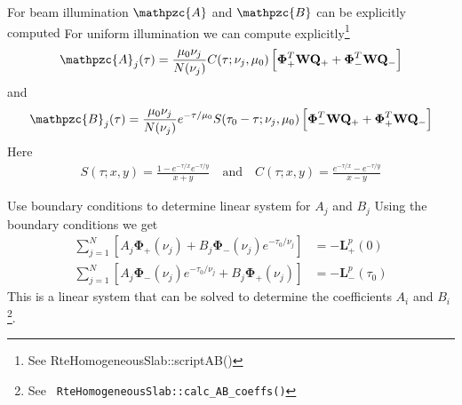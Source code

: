 \documentclass[14]{beamer}
\newcommand{\mvec}[1]{\mathbf{#1}}
\newcommand{\gvec}[1]{\boldsymbol{#1}}
\newcommand{\script}[1]{\mathpzc{#1}}
\begin{document}
\begin{frame}{For beam illumination $\script{A}$ and $\script{B}$ can
    be explicitly computed}
  For uniform illumination we can compute explicitly\footnote{See
    RteHomogeneousSlab::scriptAB()}
  \begin{align}
    \script{A}_j(\tau) = \frac{\mu_0 \nu_j}{N(\nu_j)}
    C(\tau ; \nu_j, \mu_0)
    \left[
      \gvec{\Phi}_+^T \mvec{W} \mvec{Q}_+ +
      \gvec{\Phi}_-^T \mvec{W} \mvec{Q}_-
    \right]
  \end{align}
  and
  \begin{align}
    \script{B}_j(\tau) = \frac{\mu_0 \nu_j}{N(\nu_j)}
    e^{-\tau/\mu_0}S(\tau_0-\tau ; \nu_j, \mu_0)
    \left[
      \gvec{\Phi}_-^T \mvec{W} \mvec{Q}_+ +
      \gvec{\Phi}_+^T \mvec{W} \mvec{Q}_-
    \right]
  \end{align}
  Here
  \begin{align}
    S(\tau;x,y) = \frac{1-e^{-\tau/x}e^{-\tau/y}}{x+y} \quad\textrm{and}\quad
    C(\tau;x,y) = \frac{e^{-\tau/x}-e^{-\tau/y}}{x-y}
  \end{align}
\end{frame}

\begin{frame}{Use boundary conditions to determine linear system for
    $A_j$ and $B_j$}
  Using the boundary conditions we get
  \begin{align}
    \sum_{j=1}^N
    \left[
      A_j \gvec{\Phi}_+(\nu_j) +
      B_j \gvec{\Phi}_-(\nu_j) e^{-\tau_0/\nu_j}
    \right]
    &= -\mvec{L}_+^p(0) \\
    \sum_{j=1}^N
    \left[
      A_j \gvec{\Phi}_-(\nu_j) e^{-\tau_0/\nu_j} +
      B_j \gvec{\Phi}_+(\nu_j)
    \right]
    &= -\mvec{L}_-^p(\tau_0)
  \end{align}
  This is a linear system that can be solved to determine the
  coefficients $A_i$ and $B_i$\footnote{See {\tt
      RteHomogeneousSlab::calc\_AB\_coeffs()}}.

\end{frame}
\end{document}
